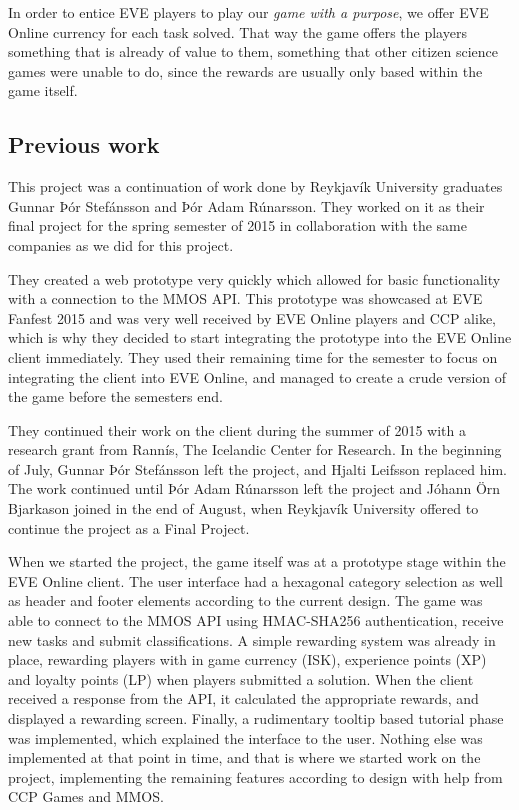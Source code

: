 	In order to entice EVE players to play our \emph{game with a purpose}, we offer EVE Online currency for each task solved. That way the game offers the players something that is already of value to them, something that other citizen science games were unable to do, since the rewards are usually only based within the game itself.

\subsection{Previous work}
	This project was a continuation of work done by Reykjavík University graduates Gunnar Þór Stefánsson and Þór Adam Rúnarsson. They worked on it as their final project for the spring semester of 2015 in collaboration with the same companies as we did for this project.

	They created a web prototype very quickly which allowed for basic functionality with a connection to the MMOS API. This prototype was showcased at EVE Fanfest 2015 \cite{fanfest} and was very well received by EVE Online players and CCP alike, which is why they decided to start integrating the prototype into the EVE Online client immediately. They used their remaining time for the semester to focus on integrating the client into EVE Online, and managed to create a crude version of the game before the semesters end.

	They continued their work on the client during the summer of 2015 with a research grant from Rannís, The Icelandic Center for Research. In the beginning of July, Gunnar Þór Stefánsson left the project, and Hjalti Leifsson replaced him. The work continued until Þór Adam Rúnarsson left the project and Jóhann Örn Bjarkason joined in the end of August, when Reykjavík University offered to continue the project as a Final Project.

	When we started the project, the game itself was at a prototype stage within the EVE Online client. The user interface had a hexagonal category selection as well as header and footer elements according to the current design. The game was able to connect to the MMOS API using HMAC-SHA256 authentication, receive new tasks and submit classifications. A simple rewarding system was already in place, rewarding players with in game currency (ISK), experience points (XP) and loyalty points (LP) when players submitted a solution. When the client received a response from the API, it calculated the appropriate rewards, and displayed a rewarding screen. Finally, a rudimentary tooltip based tutorial phase was implemented, which explained the interface to the user. Nothing else was implemented at that point in time, and that is where we started work on the project, implementing the remaining features according to design with help from CCP Games and MMOS.